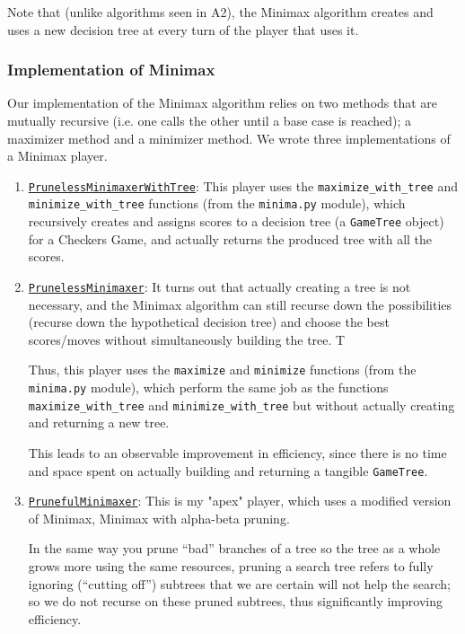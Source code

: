 \documentclass[fontsize=11pt]{article}
\begin{document}
Note that (unlike algorithms seen in A2), the Minimax algorithm creates and uses a new decision tree at every turn of the player that uses it.

\subsubsection*{Implementation of Minimax}
Our implementation of the Minimax algorithm relies on two methods that are mutually recursive (i.e. one calls the other until a base case is reached); a maximizer method and a minimizer method. We wrote three implementations of a Minimax player.

\begin{enumerate}
    \item \underline{\texttt{PrunelessMinimaxerWithTree}}:
    This player uses the \texttt{maximize\_with\_tree} and \texttt{minimize\_with\_tree} functions (from the \texttt{minima.py} module), which recursively creates and assigns scores to a decision tree (a \texttt{GameTree} object) for a Checkers Game, and actually returns the produced tree with all the scores.

    \item \underline{\texttt{PrunelessMinimaxer}}:
    It turns out that actually creating a tree is not necessary, and the Minimax algorithm can still recurse down the possibilities (recurse down the hypothetical decision tree) and choose the best scores/moves without simultaneously building the tree. T
    
    Thus, this player uses the \texttt{maximize} and \texttt{minimize} functions (from the \texttt{minima.py} module), which perform the same job as the functions \texttt{maximize\_with\_tree} and \texttt{minimize\_with\_tree} but without actually creating and returning a new tree.

    This leads to an observable improvement in efficiency, since there is no time and space spent on actually building and returning a tangible \texttt{GameTree}.

    \item \underline{\texttt{PrunefulMinimaxer}}:
    This is my "apex" player, which uses a modified version of Minimax, Minimax with alpha-beta pruning. 

    In the same way you prune “bad” branches of a tree so the tree as a whole grows more using the same resources, pruning a search tree refers to fully ignoring (“cutting off”) subtrees that we are certain will not help the search; so we do not recurse on these pruned subtrees, thus significantly improving efficiency.
    

\end{enumerate}
\end{document}

